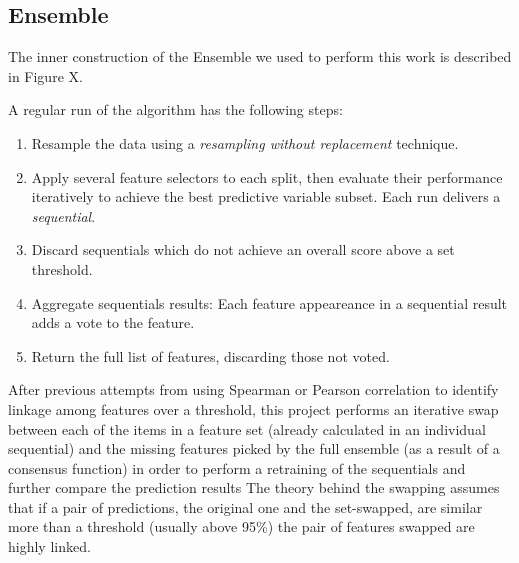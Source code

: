 \subsection{Ensemble}
The inner construction of the Ensemble we used to perform this work is described in Figure X.

A regular run of the algorithm has the following steps:
\begin{enumerate}
    \item Resample the data using a \emph{resampling without replacement} technique.
    \item Apply several feature selectors to each split, then evaluate their performance iteratively to achieve the best predictive variable subset. Each run delivers a \emph{sequential}.
    \item Discard sequentials which do not achieve an overall score above a set threshold.
    \item Aggregate sequentials results: Each feature appeareance in a sequential result adds a vote to the feature.
    \item Return the full list of features, discarding those not voted.
\end{enumerate}

After previous attempts from using Spearman or Pearson correlation to identify linkage among features over a threshold, this project performs an iterative swap between each of the items in a feature set (already calculated in an individual sequential) and the missing features picked by the full ensemble (as a result of a consensus function) in order to perform a retraining of the sequentials and further compare the prediction results 
The theory behind the swapping assumes that if a pair of predictions, the original one and the set-swapped, are similar more than a threshold (usually above 95\%) the pair of features swapped are highly linked.